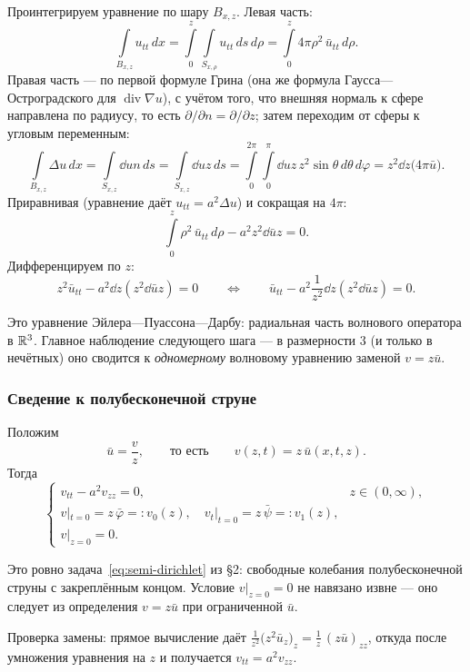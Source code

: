Проинтегрируем уравнение по шару $B_{x,z}$. Левая часть:
\[
  \int\limits_{B_{x,z}} u_{tt}\, dx
  = \int\limits_0^{z} \int\limits_{S_{x,\rho}} u_{tt}\, ds\, d\rho
  = \int\limits_0^{z} 4\pi \rho^2\, \bar u_{tt}\, d\rho .
\]
Правая часть — по первой формуле Грина (она же формула
Гаусса—Остроградского для $\operatorname{div}\nabla u$), с учётом того, что
внешняя нормаль к сфере направлена по радиусу, то есть
$\partial/\partial n = \partial/\partial z$; затем переходим от сферы к
угловым переменным:
\[
  \int\limits_{B_{x,z}} \Delta u\, dx
  = \int\limits_{S_{x,z}} \dd{u}{n}\, ds
  = \int\limits_{S_{x,z}} \dd{u}{z}\, ds
  = \int\limits_0^{2\pi} \int\limits_0^{\pi} \dd{u}{z}\, z^2 \sin\theta\,
    d\theta\, d\varphi
  = z^2 \dd{}{z}\big(4\pi \bar u\big) .
\]
Приравнивая (уравнение даёт $u_{tt} = a^2 \Delta u$) и сокращая на $4\pi$:
\[
  \int\limits_0^{z} \rho^2\, \bar u_{tt}\, d\rho
    - a^2 z^2 \dd{\bar u}{z} = 0 .
\]
Дифференцируем по $z$:
\[
  z^2 \bar u_{tt} - a^2 \dd{}{z}\!\left(z^2 \dd{\bar u}{z}\right) = 0
  \qquad\Longleftrightarrow\qquad
  \bar u_{tt} - a^2 \frac{1}{z^2} \dd{}{z}\!\left(z^2 \dd{\bar u}{z}\right) = 0 .
\]

\begin{idea}
Это уравнение Эйлера—Пуассона—Дарбу: радиальная часть волнового оператора в
$\mathbb{R}^3$. Главное наблюдение следующего шага — в размерности $3$ (и только в
нечётных) оно сводится к \emph{одномерному} волновому уравнению заменой
$v = z\bar u$.
\end{idea}

\subsubsection*{Сведение к полубесконечной струне}

Положим
\[
  \bar u = \frac{v}{z}, \qquad\text{то есть}\qquad v(z,t) = z\,\bar u(x,t,z) .
\]
Тогда
\[
  \begin{cases}
    v_{tt} - a^2 v_{zz} = 0, & z \in (0,\infty), \\[2pt]
    v|_{t=0} = z\,\bar\varphi =: v_0(z), \quad
    v_t|_{t=0} = z\,\bar\psi =: v_1(z), \\[2pt]
    v|_{z=0} = 0 .
  \end{cases}
\]

\begin{idea}
Это ровно задача~\eqref{eq:semi-dirichlet} из \S2: свободные колебания
полубесконечной струны с закреплённым концом. Условие $v|_{z=0} = 0$ не
навязано извне — оно следует из определения $v = z\bar u$ при ограниченной
$\bar u$.

\medskip
Проверка замены: прямое вычисление даёт
$\frac{1}{z^2}\big(z^2 \bar u_z\big)_z = \frac{1}{z}\,(z\bar u)_{zz}$, откуда
после умножения уравнения на $z$ и получается $v_{tt} = a^2 v_{zz}$.
\end{idea}

